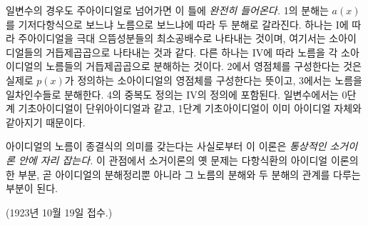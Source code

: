 일변수의 경우도 주아이디얼로 넘어가면 이 틀에 \emph{완전히 들어온다.} 1의 분해는 \(a(x)\)를 기저다항식으로 보느냐 노름으로 보느냐에 따라 두 분해로 갈라진다. 하나는 I에 따라 주아이디얼을 극대 으뜸성분들의 최소공배수로 나타내는 것이며, 여기서는 소아이디얼들의 거듭제곱곱으로 나타내는 것과 같다. 다른 하나는 IV에 따라 노름을 각 소아이디얼의 노름들의 거듭제곱곱으로 분해하는 것이다. 2에서 영점체를 구성한다는 것은 실제로 \(p(x)\)가 정의하는 소아이디얼의 영점체를 구성한다는 뜻이고, 3에서는 노름을 일차인수들로 분해한다. 4의 중복도 정의는 IV의 정의에 포함된다. 일변수에서는 0단계 기초아이디얼이 단위아이디얼과 같고, 1단계 기초아이디얼이 이미 아이디얼 자체와 같아지기 때문이다.

아이디얼의 노름이 종결식의 의미를 갖는다는 사실로부터 이 이론은 \emph{통상적인 소거이론 안에 자리 잡는다.} 이 관점에서 소거이론의 옛 문제는 다항식환의 아이디얼 이론의 한 부분, 곧 아이디얼의 분해정리뿐 아니라 그 노름의 분해와 두 분해의 관계를 다루는 부분이 된다.

\begin{center}
(1923년 10월 19일 접수.)
\end{center}

\clearpage
